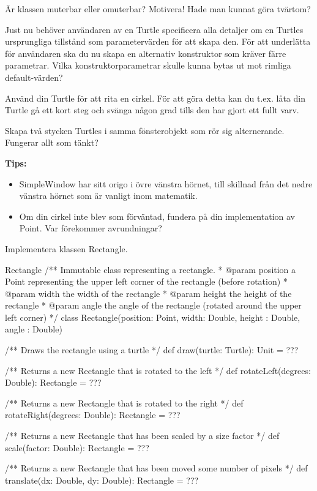 \Subtask Är klassen muterbar eller omuterbar? Motivera! Hade man kunnat göra tvärtom?

\Subtask Just nu behöver användaren av en Turtle specificera alla detaljer om en Turtles ursprungliga tillstånd som parametervärden för att skapa den. För att underlätta för användaren ska du nu skapa en alternativ konstruktor som kräver färre parametrar. Vilka konstruktorparametrar skulle kunna bytas ut mot rimliga default-värden?

\Subtask Använd din Turtle för att rita en cirkel. För att göra detta kan du t.ex. låta din Turtle gå ett kort steg och svänga någon grad tills den har gjort ett fullt varv.

\Subtask Skapa två stycken Turtles i samma fönsterobjekt som rör sig alternerande. Fungerar allt som tänkt?

\textbf{Tips:}
\begin{itemize}
\item SimpleWindow har sitt origo i övre vänstra hörnet, till skillnad från det nedre vänstra hörnet som är vanligt inom matematik.
\item Om din cirkel inte blev som förväntad, fundera på din implementation av Point. Var förekommer avrundningar?
\end{itemize}

\Task Implementera klassen Rectangle. 
\begin{ScalaSpec}{Rectangle}
/** Immutable class representing a rectangle.
  * @param position a Point representing the upper left corner of the
                    rectangle (before rotation)
  * @param width    the width of the rectangle
  * @param height   the height of the rectangle
  * @param angle    the angle of the rectangle (rotated around
                    the upper left corner)
  */
class Rectangle(position: Point, width: Double,
                height : Double, angle : Double) {
  /** Draws the rectangle using a turtle */
  def draw(turtle: Turtle): Unit = ???

  /** Returns a new Rectangle that is rotated to the left */
  def rotateLeft(degrees: Double): Rectangle = ???

  /** Returns a new Rectangle that is rotated to the right */
  def rotateRight(degrees: Double): Rectangle = ???

  /** Returns a new Rectangle that has been scaled by a size factor */
  def scale(factor: Double): Rectangle = ???

  /** Returns a new Rectangle that has been moved some number of pixels */
  def translate(dx: Double, dy: Double): Rectangle = ???
}
\end{ScalaSpec}

